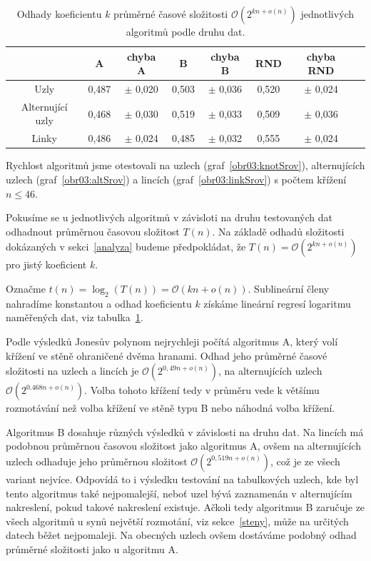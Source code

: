 \begin{table}[p]
\centering
  \begin{tabular}{*{8}{c}}
    \toprule
       & A & chyba A & B & chyba B &  RND & chyba RND \\ 
    \midrule
    Uzly  & 0,487 & $\pm$ 0,020  &   0,503 & $\pm$ 0,036   &  0,520 & $\pm$ 0,024\\
    Alternující uzly & 0,468  & $\pm$ 0,030 &  0,519 & $\pm$  0,033 & 0,509 & $\pm$ 0,036\\
    Linky  & 0,486 &  $\pm$ 0,024 &   0,485 & $\pm$  0,032  &   0,555 & $\pm$ 0,024\\
    \bottomrule
  \end{tabular}
    \caption{Odhady koeficientu $k$ průměrné časové složitosti $\mathcal{O}\left(2^{kn + o(n)}\right)$ jednotlivých algoritmů podle druhu dat.} \label{datatab}

\end{table} 

Rychlost algoritmů jsme otestovali na uzlech (graf~\ref{obr03:knotSrov}), alternujících uzlech (graf~\ref{obr03:altSrov}) a lincích (graf~\ref{obr03:linkSrov}) s počtem křížení $n \leq 46$. 

Pokusíme se u jednotlivých algoritmů v závisloti na druhu testovaných dat odhadnout průměrnou časovou složitost $T(n)$. Na základě odhadů složitosti dokázaných v sekci~\ref{analyza} budeme předpokládat, že $T(n) = \mathcal{O} \left(2^{kn + o(n)}\right)$ pro jistý koeficient $k$.

Označme $t(n) = \log_2(T(n)) = \mathcal{O} \left(kn + o(n)\right) $. Sublineární členy nahradíme konstantou a odhad koeficientu $k$ získáme lineární regresí logaritmu naměřených dat, viz tabulka~\ref{datatab}.

Podle výsledků Jonesův polynom nejrychleji počítá algoritmus A, který volí křížení ve stěně ohraničené dvěma hranami. Odhad jeho průměrné časové složitosti na uzlech a lincích je $\mathcal{O}\left(2^{0,49n+ o(n)}\right)$, na alternujících uzlech $\mathcal{O}\left(2^{0.468 n+ o(n)}\right)$. Volba tohoto křížení tedy v průměru vede k většímu rozmotávání než volba křížení ve stěně typu B nebo náhodná volba křížení. 

Algoritmus B dosahuje různých výsledků v závislosti na druhu dat. Na lincích má podobnou průměrnou časovou složitost jako algoritmus A, ovšem na alternujících uzlech odhaduje jeho průměrnou složitost $\mathcal{O}\left(2^{0,519 n+ o(n)}\right)$, což je ze všech variant nejvíce. Odpovídá to i výsledku testování na tabulkových uzlech, kde byl tento algoritmus také nejpomalejší, neboť uzel bývá zaznamenán v alternujícím nakreslení, pokud takové nakreslení existuje. Ačkoli tedy algoritmus B zaručuje ze všech algoritmů u synů největší rozmotání, viz sekce~\ref{steny}, může na určitých datech běžet nejpomaleji. Na obecných uzlech ovšem dostáváme podobný odhad průměrné složitosti jako u algoritmu A.

